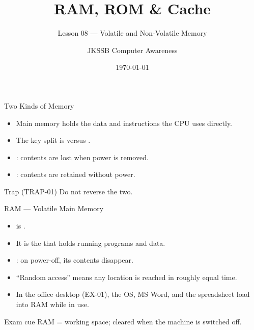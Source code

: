 \documentclass[aspectratio=169]{beamer}
\title{RAM, ROM \& Cache}
\subtitle{Lesson 08 --- Volatile and Non-Volatile Memory}
\author{JKSSB Computer Awareness}
\date{\today}
\begin{document}
\frame{\titlepage}

\begin{frame}{Two Kinds of Memory}
  \begin{itemize}
    \item Main memory holds the data and instructions the CPU uses directly.
    \item The key split is  versus .
    \item {}: contents are lost when power is removed.
    \item {}: contents are retained without power.
  \end{itemize}
  \begin{alertblock}{Trap (TRAP-01)}
     Do not reverse the two.
  \end{alertblock}
\end{frame}

\begin{frame}{RAM --- Volatile Main Memory}
  \begin{itemize}
    \item {} is .
    \item It is the  that holds running programs and data.
    \item {}: on power-off, its contents disappear.
    \item ``Random access'' means any location is reached in roughly equal
      time.
    \item In the office desktop (EX-01), the OS, MS Word, and the spreadsheet
      load into RAM while in use.
  \end{itemize}
  \begin{block}{Exam cue}
    RAM = working space; cleared when the machine is switched off.
  \end{block}
\end{frame}
\end{document}
